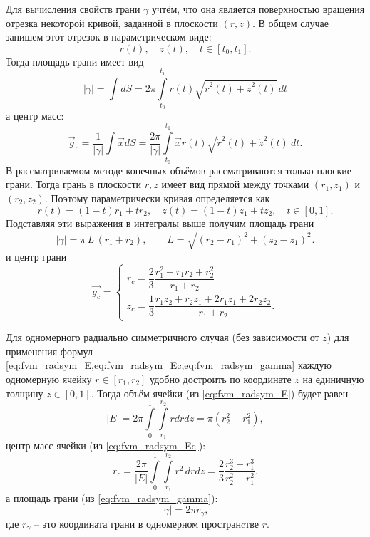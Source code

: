 Для вычисления свойств грани $\gamma$ учтём, что она является
поверхностью вращения отрезка некоторой кривой, заданной в плоскости $(r, z)$.
В общем случае запишем этот отрезок в параметрическом виде:
\begin{equation*}
r(t), \quad z(t), \quad t\in[t_0, t_1].
\end{equation*}
Тогда площадь грани имеет вид
\begin{equation*}
|\gamma| = \int dS = 2\pi\int\limits_{t_0}^{t_1} r(t) \sqrt{\dot r^2(t) + \dot z^2(t)} \, dt
\end{equation*}
а центр масс:
\begin{equation*}
\vec{g}_c = \frac{1}{|\gamma|} \int \vec{x} dS = \frac{2\pi}{|\gamma|}\int\limits_{t_0}^{t_1} \vec x r(t) \sqrt{\dot r^2(t) + \dot z^2(t)} \, dt.
\end{equation*}
В рассматриваемом методе конечных объёмов рассматриваются только плоские грани. Тогда грань
в плоскости $r, z$ имеет вид прямой между точками $(r_1, z_1)$ и $(r_2, z_2)$.
Поэтому параметрически кривая определяется как
\begin{equation*}
r(t) = (1-t)r_1 + t r_2, \quad z(t) = (1-t) z_1 + t z_2, \quad t\in[0, 1].
\end{equation*}
Подставляя эти выражения в интегралы выше получим
площадь грани
\begin{equation}
\label{eq:fvm_radsym_gamma}
|\gamma| = \pi \, L \, (r_1 + r_2), \qquad L = \sqrt{(r_2 - r_1)^2 + (z_2 - z_1)^2}.
\end{equation}
и центр грани
\begin{equation}
\label{eq:fvm_radsym_gammac}
\vec{g_c} =
\begin{cases}
r_c = \dfrac{2}{3}\dfrac{r_1^2 + r_1 r_2 + r_2^2}{r_1 + r_2} \\[10pt]
z_c = \dfrac{1}{3}\dfrac{r_1 z_2 + r_2 z_1 + 2 r_1 z_1 + 2 r_2 z_2}{r_1 + r_2}.
\end{cases}
\end{equation}

Для одномерного радиально симметричного случая (без зависимости от $z$)
для применения формул \cref{eq:fvm_radsym_E,eq:fvm_radsym_Ec,eq:fvm_radsym_gamma}
каждую одномерную ячейку $r\in[r_1, r_2]$ удобно достроить по координате $z$ на единичную толщину $z\in[0,1]$.
Тогда объём ячейки (из \cref{eq:fvm_radsym_E}) будет равен
\begin{equation}
\label{eq:fvm_radsym_E_1d}
|E| = 2 \pi \int\limits_0^1\int\limits_{r_1}^{r_2} r dr dz = \pi (r_2^2 - r_1^2),
\end{equation}
центр масс ячейки (из \cref{eq:fvm_radsym_Ec}):
\begin{equation}
\label{eq:fvm_radsym_Ec_1d}
r_c = \frac{2 \pi}{|E|}\int\limits_0^1\int\limits_{r_1}^{r_2} r^2\, drdz = \frac{2}{3}\frac{r_2^3 - r_1^3}{r_2^2 - r_1^2}.
\end{equation}
а площадь грани (из \cref{eq:fvm_radsym_gamma}):
\begin{equation}
\label{eq:fvm_radsym_gamma_1d}
|\gamma| = 2 \pi r_\gamma,
\end{equation}
где $r_\gamma$ -- это координата грани в одномерном пространcтве $r$.
